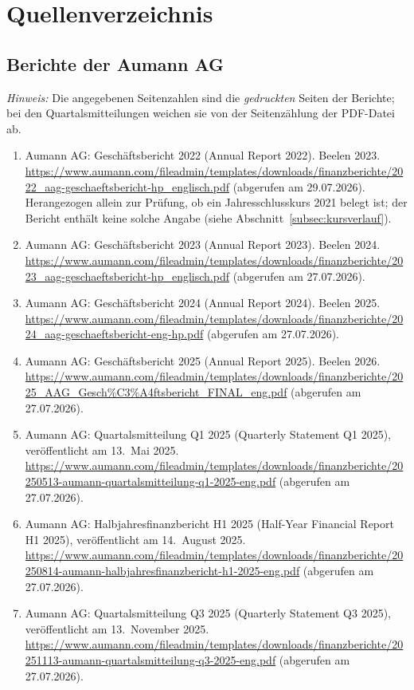 \section*{Quellenverzeichnis}

\subsection*{Berichte der Aumann AG}

\noindent\emph{Hinweis:} Die angegebenen Seitenzahlen
sind die \emph{gedruckten} Seiten der Berichte; bei den Quartalsmitteilungen
weichen sie von der Seitenz\"ahlung der PDF-Datei ab.

\medskip
\begin{enumerate}
\item\label{quelle:gb2022} Aumann AG: Gesch\"aftsbericht 2022 (Annual Report 2022). Beelen 2023.
      \url{https://www.aumann.com/fileadmin/templates/downloads/finanzberichte/2022_aag-geschaeftsbericht-hp_englisch.pdf}
      (abgerufen am 29.07.2026). Herangezogen allein zur Pr\"ufung, ob ein
      Jahresschlusskurs 2021 belegt ist; der Bericht enth\"alt keine solche
      Angabe (siehe Abschnitt~\ref{subsec:kursverlauf}).
\item\label{quelle:gb2023} Aumann AG: Gesch\"aftsbericht 2023 (Annual Report 2023). Beelen 2024.
      \url{https://www.aumann.com/fileadmin/templates/downloads/finanzberichte/2023_aag-geschaeftsbericht-hp_englisch.pdf}
      (abgerufen am 27.07.2026).
\item\label{quelle:gb2024} Aumann AG: Gesch\"aftsbericht 2024 (Annual Report 2024). Beelen 2025.
      \url{https://www.aumann.com/fileadmin/templates/downloads/finanzberichte/2024_aag-geschaeftsbericht-eng-hp.pdf}
      (abgerufen am 27.07.2026).
\item\label{quelle:gb2025} Aumann AG: Gesch\"aftsbericht 2025 (Annual Report 2025). Beelen 2026.
      \url{https://www.aumann.com/fileadmin/templates/downloads/finanzberichte/2025_AAG_Gesch%C3%A4ftsbericht_FINAL_eng.pdf}
      (abgerufen am 27.07.2026).
\item\label{quelle:Quartalsmitteilung Q1 2025} Aumann AG: Quartalsmitteilung Q1 2025 (Quarterly Statement Q1 2025),
      ver\"offentlicht am 13.~Mai 2025.
      \url{https://www.aumann.com/fileadmin/templates/downloads/finanzberichte/20250513-aumann-quartalsmitteilung-q1-2025-eng.pdf}
      (abgerufen am 27.07.2026).
\item\label{quelle:Halbjahresfinanzbericht H1 2025} Aumann AG: Halbjahresfinanzbericht H1 2025 (Half-Year Financial Report
      H1 2025), ver\"offentlicht am 14.~August 2025.
      \url{https://www.aumann.com/fileadmin/templates/downloads/finanzberichte/20250814-aumann-halbjahresfinanzbericht-h1-2025-eng.pdf}
      (abgerufen am 27.07.2026).
\item\label{quelle:Quartalsmitteilung Q3 2025} Aumann AG: Quartalsmitteilung Q3 2025 (Quarterly Statement Q3 2025),
      ver\"offentlicht am 13.~November 2025.
      \url{https://www.aumann.com/fileadmin/templates/downloads/finanzberichte/20251113-aumann-quartalsmitteilung-q3-2025-eng.pdf}
      (abgerufen am 27.07.2026).
\end{enumerate}

